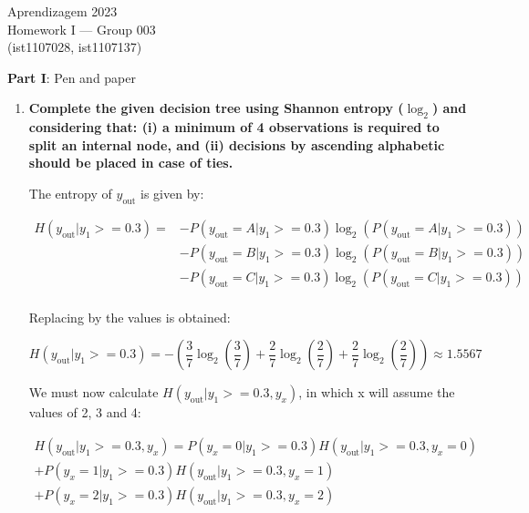 \documentclass[12pt]{article}
\begin{document}
\begin{center}
Aprendizagem 2023\\
Homework I --- Group 003\\
(ist1107028, ist1107137)\vskip 1cm
\end{center}

\large{\textbf{Part I}: Pen and paper}\normalsize

\begin{enumerate}[leftmargin=\labelsep]
\item \textbf{Complete the given decision tree using Shannon entropy ($\log_2$) and considering that:
    (i) a minimum of 4 observations is required to split an internal node, and (ii) decisions by ascending alphabetic should be placed in case of ties.}

\vspace{1em}
The entropy of $y_\text{out}$ is given by:

\begin{equation*}
    \begin{split}
        H(y_{\text{out}}|y_1 >= 0.3) = &- P(y_{\text{out}} = A|y_1 >= 0.3)\log_2(P(y_{\text{out}} = A|y_1 >= 0.3)) \\
        &- P(y_{\text{out}} = B|y_1 >= 0.3)\log_2(P(y_{\text{out}} = B|y_1 >= 0.3)) \\
        &- P(y_{\text{out}} = C|y_1 >= 0.3)\log_2(P(y_{\text{out}} = C|y_1 >= 0.3)) \\
    \end{split}
\end{equation*}

Replacing by the values is obtained:

\begin{equation*}
    H(y_{\text{out}}|y_1 >= 0.3) = - \left( \frac{3}{7} \log_2 \left( \frac{3}{7} \right) + \frac{2}{7} \log_2 \left( \frac{2}{7} \right) + \frac{2}{7} \log_2 \left( \frac{2}{7} \right) \right) \approx  1.5567
\end{equation*}

\vspace{0.5em}
We must now calculate $H(y_{\text{out}} | y_1 >= 0.3, y_x)$, in which x will assume the values of 2, 3 and 4:

\begin{equation}
    \label{H-y_out}
    \begin{split}
    H(y_{\text{out}} | y_1 >= 0.3, y_x) = P(y_x = 0 | y_1 >= 0.3) H(y_{\text{out}} | y_1 >= 0.3, y_x = 0) \\
    + P(y_x = 1 | y_1 >= 0.3) H(y_{\text{out}} | y_1 >= 0.3, y_x = 1) \\
    + P(y_x = 2 | y_1 >= 0.3) H(y_{\text{out}} | y_1 >= 0.3, y_x = 2)
    \end{split}
\end{equation}


\end{enumerate}
\end{document}
